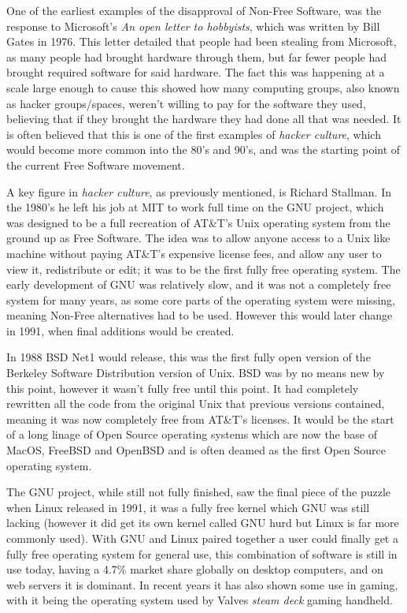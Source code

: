 \documentclass[a4paper,12pt]{article}
\begin{document}
{One of the earliest examples of the disapproval of Non-Free Software, was the response to Microsoft's \textit{An open
letter to hobbyists}, which was written by Bill Gates in 1976. This letter detailed that people had been stealing
from Microsoft, as many people had brought hardware through them, but far fewer people had brought required software
for said hardware. The fact this was happening at a scale large enough to cause this showed how many computing
groups, also known as hacker groups/spaces, weren't willing to pay for the software they used, believing that
if they brought the hardware they had done all that was needed\cite{OPENletter}. It is often believed that this
is one of the first examples of \textit{hacker culture}, which would become more common into the 80's and 90's,
and was the starting point of the current Free Software movement.

A key figure in \textit{hacker culture}, as previously mentioned, is Richard Stallman. In the
 1980's he left his job at MIT to work full time on the GNU project, which was designed
to be a full recreation of AT\&T's Unix operating system from the ground up as Free Software.  The idea was to
allow anyone access to a Unix like machine without paying AT\&T's expensive license fees, and allow any user to
view it, redistribute or edit; it was to be the first fully free operating system. The early development of GNU
was relatively slow, and it was not a completely free system for many years, as some core parts of the operating
system were missing, meaning Non-Free alternatives had to be used. However this would later change in 1991, when
final additions would be created.

In 1988 BSD Net1 would release\cite{BSDnet1}, this was the first fully open version of the Berkeley Software
Distribution version of Unix. BSD was by no means new by this point, however it wasn't fully free until this point. It
had completely rewritten all the code from the original Unix that previous versions contained, meaning it was now
completely free from AT\&T's licenses.	It would be the start of a long linage of Open Source operating systems
which are now the base of MacOS, FreeBSD and OpenBSD and is often deamed as the first Open Source operating system.

The GNU project, while still not fully finished, saw the final piece of the puzzle when Linux\cite{LINUX} released in
1991, it was a fully free kernel which GNU was still lacking (however it did get its own kernel called GNU hurd but
Linux is far more commonly used). With GNU and Linux paired together a user could finally get a fully free operating
system for general use, this combination of software is still in use today, having a 4.7\% market share globally
on desktop computers\cite{LINUXmarket}, and on web servers it is dominant. In recent years it has also shown some
use in gaming, with it being the operating system used by Valves \textit{steam deck} gaming handheld\cite{STEAMdeck}.

}
\end{document}
